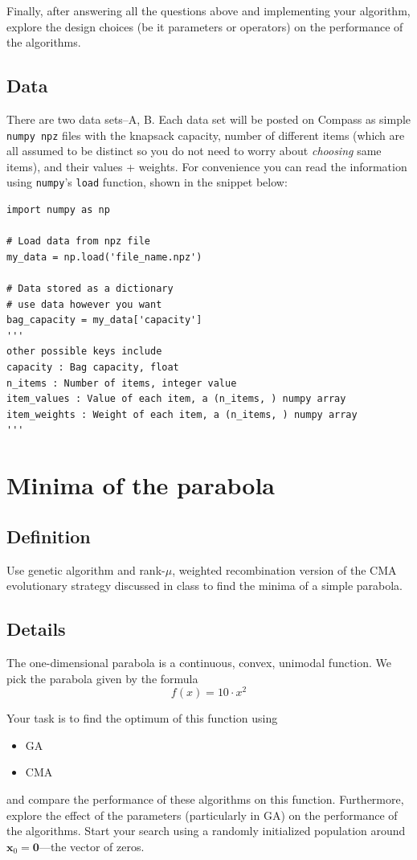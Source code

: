 \documentclass[11pt]{article}
\begin{document}
Finally, after answering all the questions above and implementing your
algorithm, explore the design choices (be it parameters or operators) on the
performance of the algorithms.
\subsection{Data}
\label{sec:data}
There are two data sets--A, B. Each data set will be posted on Compass as
simple \texttt{numpy npz} files with the knapsack capacity, number of different
items (which are all assumed to be distinct so you do not need to worry about
\emph{choosing} same items), and their values + weights. For
convenience you can read the information using \texttt{numpy}'s \texttt{load} function,
shown in the snippet below:

\begin{verbatim}
import numpy as np

# Load data from npz file
my_data = np.load('file_name.npz')

# Data stored as a dictionary
# use data however you want
bag_capacity = my_data['capacity']
'''
other possible keys include
capacity : Bag capacity, float
n_items : Number of items, integer value
item_values : Value of each item, a (n_items, ) numpy array
item_weights : Weight of each item, a (n_items, ) numpy array
'''

\end{verbatim}

\section{Minima of the parabola}
\label{sec:org2851a0c}
\subsection{Definition}
\label{sec:orge2e94e8}
  Use genetic algorithm and rank-\(\mu\), weighted recombination version of the CMA
evolutionary strategy discussed in class to find the minima of a simple parabola.
\subsection{Details}
\label{sec:orgf524d03}
The one-dimensional parabola is a continuous, convex, unimodal function. We
pick the parabola given by the formula
\begin{equation}
f(x) = 10 \cdot x^2
\end{equation}

Your task is to find the optimum of this function using
\begin{itemize}
\item GA
\item CMA
\end{itemize}
and compare the performance of these algorithms on this function.
Furthermore, explore the effect of the parameters (particularly in GA) on the
performance of the algorithms. Start your search using a randomly initialized population around \(\mathbf{x}_0 = \mathbf{0}\)---the vector of zeros.
\end{document}
